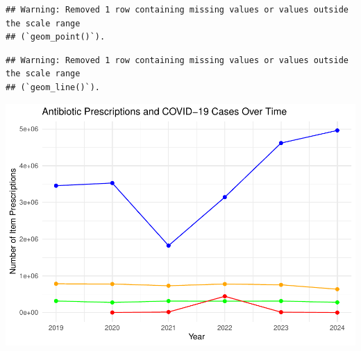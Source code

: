 \documentclass[
]{article}
\begin{document}
\begin{verbatim}
## Warning: Removed 1 row containing missing values or values outside the scale range
## (`geom_point()`).
\end{verbatim}

\begin{verbatim}
## Warning: Removed 1 row containing missing values or values outside the scale range
## (`geom_line()`).
\end{verbatim}

\includegraphics{index_files/figure-latex/unnamed-chunk-1-1.pdf}
\end{document}
